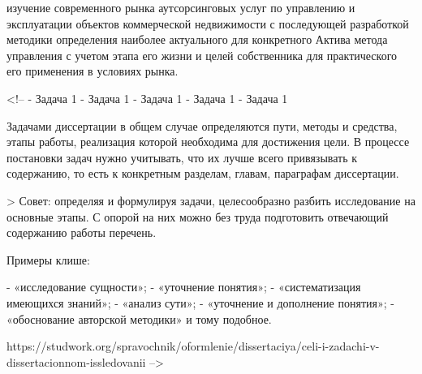 изучение современного рынка аутсорсинговых услуг по управлению и эксплуатации объектов коммерческой недвижимости с последующей разработкой методики определения наиболее актуального для конкретного Актива метода управления с учетом этапа его жизни и целей собственника для практического его применения в условиях рынка.

<!-- - Задача 1
- Задача 1
- Задача 1
- Задача 1
- Задача 1

Задачами диссертации в общем случае определяются пути, методы и средства, этапы работы, реализация которой необходима для достижения цели. В процессе постановки задач нужно учитывать, что их лучше всего привязывать к содержанию, то есть к конкретным разделам, главам, параграфам диссертации.

> Совет: определяя и формулируя задачи, целесообразно разбить исследование на основные этапы. С опорой на них можно без труда подготовить отвечающий содержанию работы перечень.

Примеры клише:

- «исследование сущности»;
- «уточнение понятия»;
- «систематизация имеющихся знаний»;
- «анализ сути»;
- «уточнение и дополнение понятия»;
- «обоснование авторской методики» и тому подобное.

https://studwork.org/spravochnik/oformlenie/dissertaciya/celi-i-zadachi-v-dissertacionnom-issledovanii -->